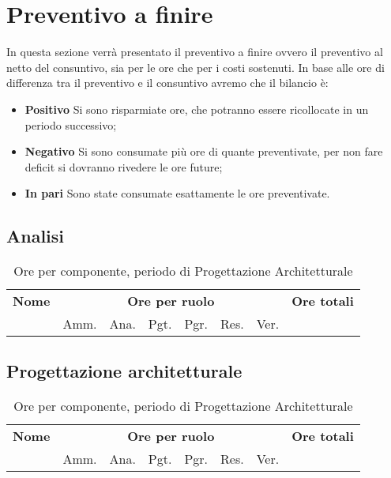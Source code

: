 \section{Preventivo a finire}
\label{consuntivo}

In questa sezione verrà presentato il preventivo a finire ovvero il preventivo al netto del consuntivo, sia per le ore che per i costi sostenuti. In base alle ore di differenza tra il preventivo e il consuntivo avremo che il bilancio è:
\begin{itemize}
\item \textbf{Positivo} Si sono risparmiate ore, che potranno essere ricollocate in un periodo successivo;
\item \textbf{Negativo} Si sono consumate più ore di quante preventivate, per non fare deficit si dovranno rivedere le ore future;
\item \textbf{In pari} Sono state consumate esattamente le ore preventivate.
\end{itemize}

\subsection{Analisi}
\begin{table}[H]
\begin{tabular}{lccccccc}
\toprule
    \textbf{Nome}  & \multicolumn{6}{c}{\textbf{Ore per ruolo}} & \textbf{Ore totali} \\
     & Amm. & Ana. & Pgt. & Pgr. & Res. & Ver. & \\
    \midrule
    
    	
    
    \bottomrule
\end{tabular}
\caption{Ore per componente, periodo di Progettazione Architetturale}
\end{table}

\subsection{Progettazione architetturale}

\begin{table}[H]
\begin{tabular}{lccccccc}
\toprule
    \textbf{Nome}  & \multicolumn{6}{c}{\textbf{Ore per ruolo}} & \textbf{Ore totali} \\
     & Amm. & Ana. & Pgt. & Pgr. & Res. & Ver. & \\
    \midrule
    
    	
    
    \bottomrule
\end{tabular}

\caption{Ore per componente, periodo di Progettazione Architetturale}
\end{table}

